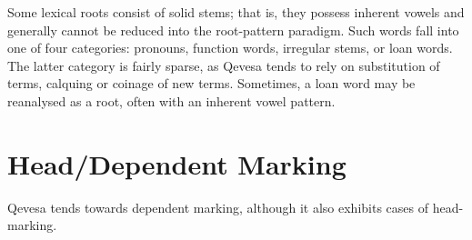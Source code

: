 \documentclass[grammar]{subfiles}
\begin{document}
  Some lexical roots consist of solid stems; that is, they possess inherent vowels and generally cannot be reduced into the root-pattern paradigm. Such words fall into one of four categories: pronouns, function words, irregular stems, or loan words. The latter category is fairly sparse, as Qevesa tends to rely on substitution of terms, calquing or coinage of new terms. Sometimes, a loan word may be reanalysed as a root, often with an inherent vowel pattern.

  \section{Head/Dependent Marking}
  \label{sec:mt_head_dependent_marking}

  Qevesa tends towards dependent marking, although it also exhibits cases of head-marking.

  \ToBeWritten













\end{document}

